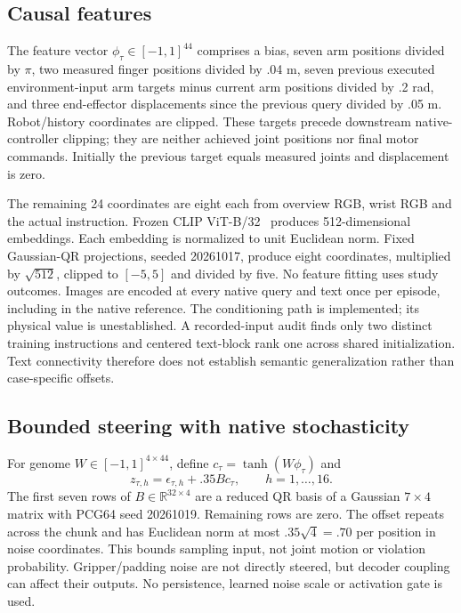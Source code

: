 \documentclass[sigconf,dvipsnames,balance=false]{acmart}
\begin{document}
\subsection{Causal features}
The feature vector $\phi_\tau\in[-1,1]^{44}$ comprises a bias, seven arm positions
divided by $\pi$, two measured finger positions divided by .04 m, seven previous
executed environment-input arm targets minus current arm positions divided by .2 rad, and three
end-effector displacements since the previous query divided by .05 m. Robot/history
coordinates are clipped. These targets precede downstream native-controller clipping;
they are neither achieved joint positions nor final motor commands. Initially the previous target equals measured joints and
displacement is zero.

The remaining 24 coordinates are eight each from overview RGB, wrist RGB and the
actual instruction. Frozen CLIP ViT-B/32~\cite{clip} produces 512-dimensional
embeddings. Each embedding is normalized to unit Euclidean norm. Fixed Gaussian-QR
projections, seeded 20261017, produce eight coordinates, multiplied by $\sqrt{512}$,
clipped to $[-5,5]$ and divided by five.
No feature fitting uses study outcomes. Images are encoded at every native query
and text once per episode, including in the native reference. The conditioning
path is implemented; its physical value is unestablished. A recorded-input audit
finds only two distinct training instructions and centered text-block rank one
across shared initialization. Text connectivity therefore does not establish
semantic generalization rather than case-specific offsets.

\subsection{Bounded steering with native stochasticity}
For genome $W\in[-1,1]^{4\times44}$, define $c_\tau=\tanh(W\phi_\tau)$ and
\begin{equation}
 z_{\tau,h}=\epsilon_{\tau,h}+.35Bc_\tau,
 \qquad h=1,\ldots,16.
 \label{eq:steering}
\end{equation}
The first seven rows of $B\in\mathbb R^{32\times4}$ are a reduced QR basis of
a Gaussian $7\times4$ matrix with PCG64 seed 20261019. Remaining rows are zero.
The offset repeats across the chunk and has Euclidean norm at most
$.35\sqrt4=.70$ per position in noise coordinates. This bounds sampling input,
not joint motion or violation probability. Gripper/padding noise are not directly
steered, but decoder coupling can affect their outputs. No persistence, learned
noise scale or activation gate is used.
\end{document}
